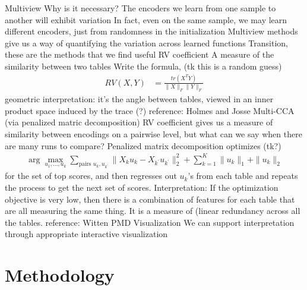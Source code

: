 \documentclass[11pt]{article}
\begin{document}
\begin{outline}
\1 Multiview
  \2 Why is it necessary?
    \3 The encoders we learn from one sample to another will exhibit variation
      \4 In fact, even on the same sample, we may learn different encoders, just
      from randomness in the initialization
    \3 Multiview methods give us a way of quantifying the variation across
    learned functions
  \2 Transition, these are the methods that we find useful
  \2 RV coefficient
    \3 A measure of the similarity between two tables
    \3 Write the formula, (tk this is a random guess)
    \begin{align}
      RV\left(X, Y\right) &= \frac{tr\left(X^T Y\right)}{\|X\|_{F}\|Y\|_{F}}
    \end{align}
    \3 geometric interpretation: it's the angle between tables, viewed in an
    inner product space induced by the trace (?)
    \3 reference: Holmes and Josse
  \2 Multi-CCA (via penalized matric decomposition)
    \3 RV coefficient gives us a measure of similarity between encodings on a
    pairwise level, but what can we say when there are many runs to compare?
    \3 Penalized matrix decomposition optimizes (tk?)
    \begin{align}
      \arg\max_{u_1, \dots, u_{k}} \sum_{\text{pairs } u_{k}, u_{k^{\prime}}} \|X_{k}u_{k} - X_{k^{\prime}}u_{k^{\prime}}\|_{2}^{2} + \sum_{k = 1}^{K} \|u_{k}\|_{1} + \|u_{k}\|_{2}
    \end{align}
    for the set of top scores, and then regresses out $u_{k}$'s from each table
    and repeats the process to get the next set of scores.
    \3 Interpretation: If the optimization objective is very low, then there is
    a combination of features for each table that are all measuring the same
    thing. It is a measure of (linear redundancy across all the tables.
    \3 reference: Witten PMD
\1 Visualization
  \2 We can support interpretation through appropriate interactive visualization
\end{outline}

\section{Methodology}
\end{document}

